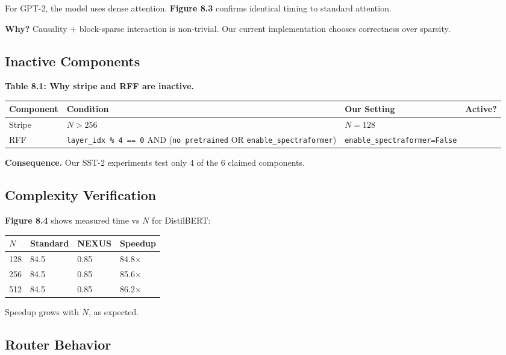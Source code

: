 For GPT-2, the model uses dense attention. \textbf{Figure 8.3} confirms identical 
timing to standard attention.

\textbf{Why?} Causality + block-sparse interaction is non-trivial. Our current 
implementation chooses correctness over sparsity.

\subsection{Inactive Components}

\textbf{Table 8.1: Why stripe and RFF are inactive.}

\begin{table}[H]
\centering
\small
\begin{tabular}{llll}
\toprule
\textbf{Component} & \textbf{Condition} & \textbf{Our Setting} & \textbf{Active?} \\
\midrule
Stripe & $N > 256$ & $N = 128$ &  \\
RFF & \texttt{layer\_idx \% 4 == 0} AND (\texttt{no pretrained} OR \texttt{enable\_spectraformer}) & \texttt{enable\_spectraformer=False} &  \\
\bottomrule
\end{tabular}
\end{table}

\textbf{Consequence.} Our SST-2 experiments test only 4 of the 6 claimed 
components.

\subsection{Complexity Verification}

\textbf{Figure 8.4} shows measured time vs $N$ for DistilBERT:

\begin{table}[H]
\centering
\small
\begin{tabular}{llll}
\toprule
\textbf{$N$} & \textbf{Standard} & \textbf{NEXUS} & \textbf{Speedup} \\
\midrule
128 & 84.5 & 0.85 & 84.8$\times$ \\
256 & 84.5 & 0.85 & 85.6$\times$ \\
512 & 84.5 & 0.85 & 86.2$\times$ \\
\bottomrule
\end{tabular}
\end{table}

Speedup grows with $N$, as expected.

\subsection{Router Behavior}

